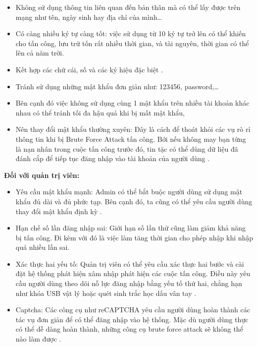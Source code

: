 \begin{itemize}
     \item Không sử dụng thông tin liên quan đến bản thân mà có thể lấy được trên mạng như tên, ngày sinh hay địa chỉ của mình…
    \item Có càng nhiều ký tự càng tốt: việc sử dụng từ 10 ký tự trở lên có thể khiến cho tấn công, lưu trữ tốn rất nhiều thời gian, và tài nguyên, thời gian có thể lên cả năm trời.
   \item Kết hợp các chữ cái, số và các ký hiệu đặc biệt \cite{ayankoya2019brute}.
    \item Tránh sử dụng những mật khẩu đơn giản như: 123456, password,…
     \item Bên cạnh đó việc không sử dụng cùng 1 mật khẩu trên nhiều tài khoản khác nhau có thể tránh tối đa hậu quả khi bị mất mật khẩu,
    \item Nên thay đổi mật khẩu thường xuyên: Đây là cách để thoát khỏi các vụ rò rỉ thông tin khi bị Brute Force Attack tấn công. Bởi nếu không may bạn từng là nạn nhân trong cuộc tấn công trước đó, tin tặc có thể dùng dữ liệu đã đánh cắp để tiếp tục đăng nhập vào tài khoản của người dùng \cite{ayankoya2019brute}.

\end{itemize}



\textbf{Đối với quản trị viên:}

\begin{itemize}
         \item Yêu cầu mật khẩu mạnh: Admin có thể bắt buộc người dùng sử dụng mật khẩu đủ dài và đủ phức tạp. Bên cạnh đó, ta cũng có thể yêu cầu người dùng thay đổi mật khẩu định kỳ \cite{vugdelija2021review}.
          \item Hạn chế số lần đăng nhập sai: Giới hạn số lần thử cũng làm giảm khả năng bị tấn công. Đi kèm với đó là việc làm tăng thời gian cho phép nhập khi nhập quá nhiều lần sai.
        \item  Xác thực hai yếu tố: Quản trị viên có thể yêu cầu xác thực hai bước và cài đặt hệ thống phát hiện xâm nhập phát hiện các cuộc tấn công. Điều này yêu cầu người dùng theo dõi nỗ lực đăng nhập bằng yếu tố thứ hai, chẳng hạn như khóa USB vật lý hoặc quét sinh trắc học dấu vân tay \cite{vugdelija2021review}.
         \item Captcha: Các công cụ như reCAPTCHA yêu cầu người dùng hoàn thành các tác vụ đơn giản để có thể đăng nhập vào hệ thống. Mặc dù người dùng thực có thể dễ dàng hoàn thành, những công cụ brute force attack sẽ không thể nào làm được \cite{vugdelija2021review}.

\end{itemize}
